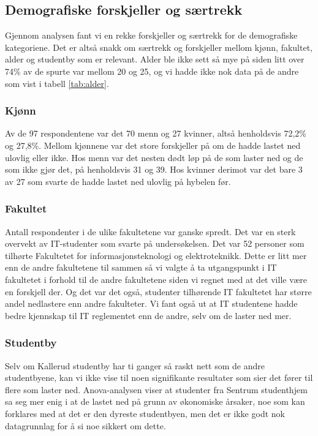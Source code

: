 \subsection{Demografiske forskjeller og særtrekk}
Gjennom analysen fant vi en rekke forskjeller og særtrekk for de demografiske kategoriene. Det er altså snakk om særtrekk og forskjeller mellom kjønn, fakultet, alder og studentby som er relevant. Alder ble ikke sett så mye på siden litt over 74\% av de spurte var mellom 20 og 25, og vi hadde ikke nok data på de andre som vist i tabell \ref{tab:alder}. 

\subsubsection{Kjønn}
Av de 97 respondentene var det 70 menn og 27 kvinner, altså henholdsvis 72,2\% og 27,8\%. Mellom kjønnene var det store forskjeller på om de hadde lastet ned ulovlig eller ikke. Hos menn var det nesten dødt løp på de som laster ned og de som ikke gjør det, på henholdsvis 31 og 39. Hos kvinner derimot var det bare 3 av 27 som svarte de hadde lastet ned ulovlig på hybelen før. 

\subsubsection{Fakultet}
Antall respondenter i de ulike fakultetene var ganske spredt. Det var en sterk overvekt av IT-studenter som svarte på undersøkelsen. Det var 52 personer som tilhørte Fakultetet for informasjonsteknologi og elektroteknikk. Dette er litt mer enn de andre fakultetene til sammen så vi valgte å ta utgangspunkt i IT fakultetet i forhold til de andre fakultetene siden vi regnet med at det ville være en forskjell der. Og det var det også, studenter tilhørende IT fakultetet har større andel nedlastere enn andre fakulteter. Vi fant også ut at IT studentene hadde bedre kjennskap til IT reglementet enn de andre, selv om de laster ned mer.

\subsubsection{Studentby}
Selv om Kallerud studentby har ti ganger så raskt nett som de andre studentbyene, kan vi ikke vise til noen signifikante resultater som sier det fører til flere som laster ned. Anova-analysen viser at studenter fra Sentrum studenthjem sa seg mer enig i at de lastet ned på grunn av økonomiske årsaker, noe som kan forklares med at det er den dyreste studentbyen, men det er ikke godt nok datagrunnlag for å si noe sikkert om dette. 

